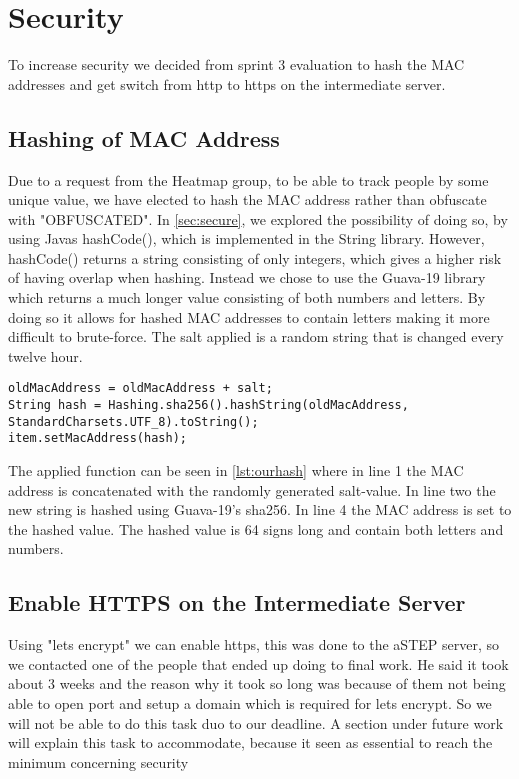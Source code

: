 \section*{Security}
To increase security we decided from sprint 3 evaluation to hash the MAC addresses and get switch from http to https on the intermediate server.

\subsection*{Hashing of MAC Address}
Due to a request from the Heatmap group, to be able to track people by some unique value, we have elected to hash the MAC address rather than obfuscate with "OBFUSCATED". In \cref{sec:secure}, we explored the possibility of doing so, by using Javas hashCode(), which is implemented in the String library. However, hashCode() returns a string consisting of only integers, which gives a higher risk of having overlap when hashing. Instead we chose to use the Guava-19 library which returns a much longer value consisting of both numbers and letters. By doing so it allows for hashed MAC addresses to contain letters making it more difficult to brute-force. The salt applied is a random string that is changed every twelve hour. 

\begin{lstlisting}[caption={Hashing a MAC address},label={lst:ourhash},language=inc_Java]
oldMacAddress = oldMacAddress + salt;
String hash = Hashing.sha256().hashString(oldMacAddress, 
StandardCharsets.UTF_8).toString();
item.setMacAddress(hash);
\end{lstlisting}

The applied function can be seen in \cref{lst:ourhash} where in line 1 the MAC address is concatenated with the randomly generated salt-value. In line two the new string is hashed using Guava-19's sha256. In line 4 the MAC address is set to the hashed value. The hashed value is 64 signs long and contain both letters and numbers.

\subsection*{Enable HTTPS on the Intermediate Server}
Using "lets encrypt" we can enable https, this was done to the aSTEP server, so we contacted one of the people that ended up doing to final work. He said it took about 3 weeks and the reason why it took so long was because of them not being able to open port and setup a domain which is required for lets encrypt. So we will not be able to do this task duo to our deadline. A section under future work will explain this task to accommodate, because it seen as essential to reach the minimum concerning security